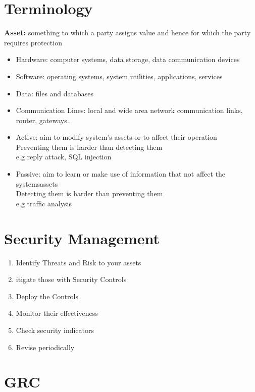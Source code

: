 \documentclass[10pt,a4paper]{book}
\begin{document}
\section{Terminology}
\textbf{Asset:} something to which a party assigns value and hence for which the party requires protection
\begin{itemize}
\item Hardware:  computer systems, data storage, data communication devices
\item Software: operating systems, system utilities, applications, services
\item Data:  files and databases
\item Communication Lines: local and wide area network communication links, router, gateways..
\end{itemize}


\begin{itemize}
\item Active:  aim to modify system's assets or to affect their operation\\
	Preventing them is harder than detecting them\\
	e.g reply attack, SQL injection
\item Passive: aim to learn or make use of information that not affect the systemsassets\\
	Detecting them is harder than preventing them\\
	e.g traffic analysis 
\end{itemize}

\section{Security Management}

\begin{enumerate}
\item Identify Threats and Risk to your assets
\item itigate those with Security Controls
\item Deploy the Controls
\item Monitor their effectiveness
\item Check security indicators
\item Revise periodically
\end{enumerate}

\section{GRC}
\end{document}
